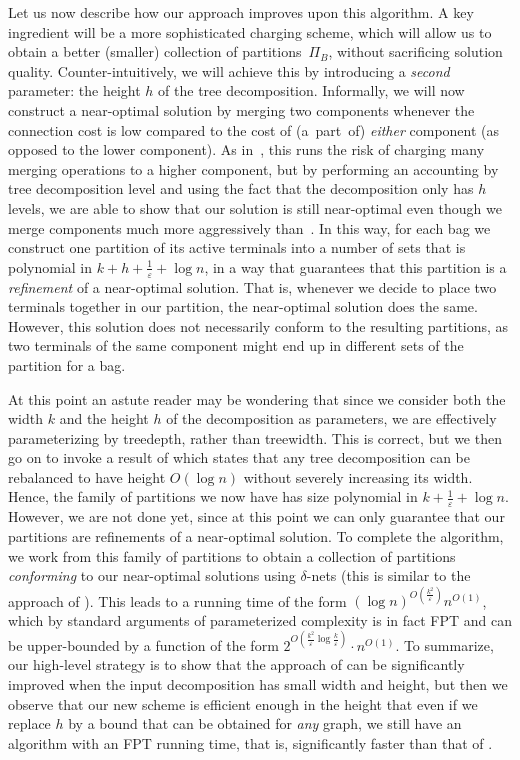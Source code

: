 \documentclass[a4paper]{article}
\let\oldcitet\citet
\renewcommand{\citet}[1]{\mbox{\oldcitet{#1}}}
\theoremstyle{plain}
\newcommand{\eps}{{\varepsilon}}
\begin{document}
Let us now describe how our approach improves upon this algorithm. A key
ingredient  will be a more sophisticated charging scheme, which will allow us
to obtain a better (smaller) collection of partitions~$\Pi_B$, without
sacrificing solution quality.  Counter-intuitively, we will achieve this by
introducing a \emph{second} parameter: the height $h$ of the tree
decomposition.  Informally, we will now construct a near-optimal solution by
merging two components whenever the connection cost is low compared to the cost of
(a~part~of) \emph{either} component (as opposed to the lower component). As 
in~\cite{bateni2011approximation}, this runs the risk of charging many merging
operations to a higher component, but by performing an accounting by tree
decomposition level and using the fact that the decomposition only has $h$
levels, we are able to show that our solution is still near-optimal even though
we merge components much more aggressively than~\cite{bateni2011approximation}.
In this way, for each bag we construct one partition of its active terminals into
a number of sets that is polynomial in $k+h+\frac{1}{\eps}+\log n$, in a way
that guarantees that this partition is a \emph{refinement} of a near-optimal
solution. That is, whenever we decide to place two terminals together in our
partition, the near-optimal solution does the same. However, this solution does
not necessarily conform to the resulting partitions, as two terminals of the same component
might end up in different sets of the partition for a bag.

At this point an astute reader may be wondering that since we consider both the
width $k$ and the height $h$ of the decomposition as parameters, we are
effectively parameterizing by treedepth, rather than treewidth. This is
correct, but we then go on to invoke a result of \citet{BodlaenderH98} which
states that any tree decomposition can be rebalanced to have height $O(\log n)$
without severely increasing its width. Hence, the family of partitions we now
have has size polynomial in $k+\frac{1}{\eps}+\log n$. 
However, we are not done yet, since at this point we can
only guarantee that our partitions are refinements of a near-optimal
solution. To complete the algorithm, we work from this family of partitions to
obtain a collection of partitions \emph{conforming} to our near-optimal
solutions using $\delta$-nets (this is similar to the approach of
\cite{bateni2011approximation}). This leads to a running time of the form
$(\log n)^{O(\frac{k^2}{\eps})}n^{O(1)}$, which by standard arguments of parameterized
complexity is in fact FPT and can be upper-bounded by a function of the form
$2^{O(\frac{k^2}{\eps}\log\frac{k}{\eps})}\cdot n^{O(1)}$. 
To summarize, our high-level strategy is to
show that the approach of \cite{bateni2011approximation} can be significantly
improved when the input decomposition has small width and height, but then we
observe that our new scheme is efficient enough in the height that even if we
replace $h$ by a bound that can be obtained for \emph{any} graph, we still have
an algorithm with an FPT running time, that is, significantly faster than that
of \cite{bateni2011approximation}. 
\end{document}
